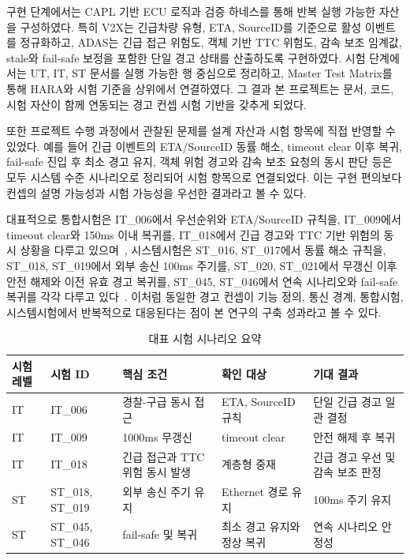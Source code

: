 \documentclass[10pt,a4paper,twocolumn]{article}
\begin{document}
구현 단계에서는 CAPL 기반 ECU 로직과 검증 하네스를 통해 반복 실행 가능한 자산을 구성하였다. 특히 V2X는 긴급차량 유형, ETA, SourceID를 기준으로 활성 이벤트를 정규화하고, ADAS는 긴급 접근 위험도, 객체 기반 TTC 위험도, 감속 보조 임계값, stale와 fail-safe 보정을 포함한 단일 경고 상태를 산출하도록 구현하였다. 시험 단계에서는 UT, IT, ST 문서를 실행 가능한 행 중심으로 정리하고, Master Test Matrix를 통해 HARA와 시험 기준을 상위에서 연결하였다. 그 결과 본 프로젝트는 문서, 코드, 시험 자산이 함께 연동되는 경고 컨셉 시험 기반을 갖추게 되었다.

또한 프로젝트 수행 과정에서 관찰된 문제를 설계 자산과 시험 항목에 직접 반영할 수 있었다. 예를 들어 긴급 이벤트의 ETA/SourceID 동률 해소, timeout clear 이후 복귀, fail-safe 진입 후 최소 경고 유지, 객체 위험 경고와 감속 보조 요청의 동시 판단 등은 모두 시스템 수준 시나리오로 정리되어 시험 항목으로 연결되었다. 이는 구현 편의보다 컨셉의 설명 가능성과 시험 가능성을 우선한 결과라고 볼 수 있다.

대표적으로 통합시험은 IT\_006에서 우선순위와 ETA/SourceID 규칙을, IT\_009에서 timeout clear와 150ms 이내 복귀를, IT\_018에서 긴급 경고와 TTC 기반 위험의 동시 상황을 다루고 있으며~\cite{integration_test}, 시스템시험은 ST\_016, ST\_017에서 동률 해소 규칙을, ST\_018, ST\_019에서 외부 송신 100ms 주기를, ST\_020, ST\_021에서 무갱신 이후 안전 해제와 이전 유효 경고 복귀를, ST\_045, ST\_046에서 연속 시나리오와 fail-safe 복귀를 각각 다루고 있다~\cite{system_test}. 이처럼 동일한 경고 컨셉이 기능 정의, 통신 경계, 통합시험, 시스템시험에서 반복적으로 대응된다는 점이 본 연구의 구축 성과라고 볼 수 있다.

\begin{table}[t]
\caption{대표 시험 시나리오 요약}
\label{tab:test_scenarios}
\centering
\footnotesize
\setlength{\tabcolsep}{4pt}
\begin{tabularx}{\textwidth}{>{\raggedright\arraybackslash}p{1.7cm} >{\raggedright\arraybackslash}p{2.1cm} >{\raggedright\arraybackslash}p{3.6cm} >{\raggedright\arraybackslash}p{3.0cm} >{\raggedright\arraybackslash}X}
\toprule
시험 레벨 & 시험 ID & 핵심 조건 & 확인 대상 & 기대 결과 \\
\midrule
IT & IT\_006 & 경찰-구급 동시 접근 & ETA, SourceID 규칙 & 단일 긴급 경고 일관 결정 \\
IT & IT\_009 & 1000ms 무갱신 & timeout clear & 안전 해제 후 복귀 \\
IT & IT\_018 & 긴급 접근과 TTC 위험 동시 발생 & 계층형 중재 & 긴급 경고 우선 및 감속 보조 판정 \\
ST & ST\_018, ST\_019 & 외부 송신 주기 유지 & Ethernet 경로 유지 & 100ms 주기 유지 \\
ST & ST\_045, ST\_046 & fail-safe 및 복귀 & 최소 경고 유지와 정상 복귀 & 연속 시나리오 안정성 \\
\bottomrule
\end{tabularx}
\end{table}
\end{document}
